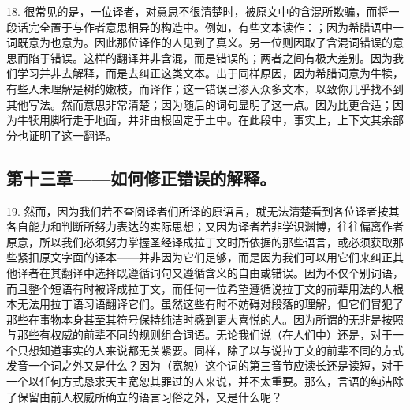 18. 很常见的是，一位译者，对意思不很清楚时，被原文中的含混所欺骗，而将一段话完全置于与作者意思相异的构造中。例如，有些文本读作：；因为希腊语中一词既意为也意为。因此那位译作的人见到了真义。另一位则因取了含混词错误的意思而陷于错误。这样的翻译并非含混，而是错误的；两者之间有极大差别。因为我们学习并非去解释，而是去纠正这类文本。出于同样原因，因为希腊词意为牛犊，有些人未理解是树的嫩枝，而译作；这一错误已渗入众多文本，以致你几乎找不到其他写法。然而意思非常清楚；因为随后的词句显明了这一点。因为比更合适；因为牛犊用脚行走于地面，并非由根固定于土中。在此段中，事实上，上下文其余部分也证明了这一翻译。\par


\subsection{第十三章——如何修正错误的解释。}

19. 然而，因为我们若不查阅译者们所译的原语言，就无法清楚看到各位译者按其各自能力和判断所努力表达的实际思想；又因为译者若非学识渊博，往往偏离作者原意，所以我们必须努力掌握圣经译成拉丁文时所依据的那些语言，或必须获取那些紧扣原文字面的译本——并非因为它们足够，而是因为我们可以用它们来纠正其他译者在其翻译中选择既遵循词句又遵循含义的自由或错误。因为不仅个别词语，而且整个短语有时被译成拉丁文，而任何一位希望遵循说拉丁文的前辈用法的人根本无法用拉丁语习语翻译它们。虽然这些有时不妨碍对段落的理解，但它们冒犯了那些在事物本身甚至其符号保持纯洁时感到更大喜悦的人。因为所谓的无非是按照与那些有权威的前辈不同的规则组合词语。无论我们说（在人们中）还是，对于一个只想知道事实的人来说都无关紧要。同样，除了以与说拉丁文的前辈不同的方式发音一个词之外又是什么？因为（宽恕）这个词的第三音节应读长还是读短，对于一个以任何方式恳求天主宽恕其罪过的人来说，并不太重要。那么，言语的纯洁除了保留由前人权威所确立的语言习俗之外，又是什么呢？\par

